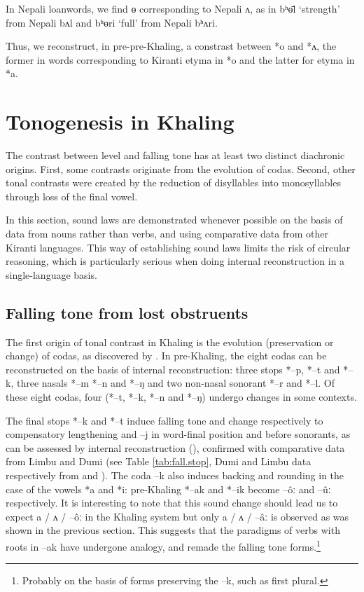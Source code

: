 \documentclass[oldfontcommands,oneside,a4paper,11pt]{article}
\newcommand{\ipa}[1]{{\phon \mbox{#1}}} %
\begin{document}
In Nepali loanwords, we find \ipa{ɵ} corresponding to Nepali  \ipa{ʌ}, as in \ipa{bʰɵ̄l}	`strength' from Nepali \ipa{bʌl} and \ipa{bʰɵri}	`full' from Nepali \ipa{bʰʌri}.

Thus, we reconstruct, in pre-pre-Khaling, a constrast between \ipa{*o} and \ipa{*ʌ}, the former in words corresponding to Kiranti etyma in \ipa{*o} and the latter for etyma in \ipa{*a}.


\section{Tonogenesis in Khaling}
The contrast between level and falling tone has at least two distinct diachronic origins. First, some contrasts originate from the evolution of codas. Second, other tonal contrasts were created by the reduction of disyllables into monosyllables through loss of the final vowel.

In this section, sound laws are demonstrated whenever possible on the basis of data from nouns rather than verbs, and  using comparative data from other Kiranti languages. This way of establishing sound laws limits the risk of circular reasoning, which is particularly serious when doing internal reconstruction in a single-language basis.

\subsection{Falling tone from lost obstruents} \label{sec:obstruents}
 The first origin of tonal contrast in Khaling is the evolution (preservation or change) of codas, as discovered by \citet{michailovsky75khaling}. In pre-Khaling, the eight codas can be reconstructed on the basis of internal reconstruction: three stops \ipa{*--p}, \ipa{*--t} and \ipa{*--k}, three nasals \ipa{*--m} \ipa{*--n} and \ipa{*--ŋ} and two non-nasal sonorant \ipa{*--r} and \ipa{*--l}. Of these eight codas, four (*--t, \ipa{*--k}, \ipa{*--n} and \ipa{*--ŋ}) undergo changes in some contexts. 


The final stops \ipa{*--k} and \ipa{*--t} induce falling tone and change respectively to compensatory lengthening and \ipa{--j} in word-final position and before sonorants, as can be assessed by internal reconstruction (\citealt{jacques12khaling}), confirmed with comparative data from Limbu and Dumi (see Table \ref{tab:fall.stop}, Dumi and Limbu data respectively from \citealt{driem93dumi} and \citealt{michailovsky02dico}). The coda \ipa{--k} also induces backing and rounding in the case of the vowels \ipa{*a} and \ipa{*i}: pre-Khaling \ipa{*--ak} and \ipa{*--ik} become \ipa{--ôː} and \ipa{--ûː} respectively. It is interesting to note that this sound change should lead us to expect \ipa{a} / \ipa{ʌ} / \ipa{--ôː} in the Khaling system but only \ipa{a} / \ipa{ʌ} / \ipa{--âː} is observed as was shown in the previous section. This suggests that the paradigms of verbs with roots in \ipa{--ak} have undergone analogy, and remade the falling tone forms.\footnote{Probably on the basis of forms preserving the \ipa{--k}, such as   first plural.}
\end{document}
